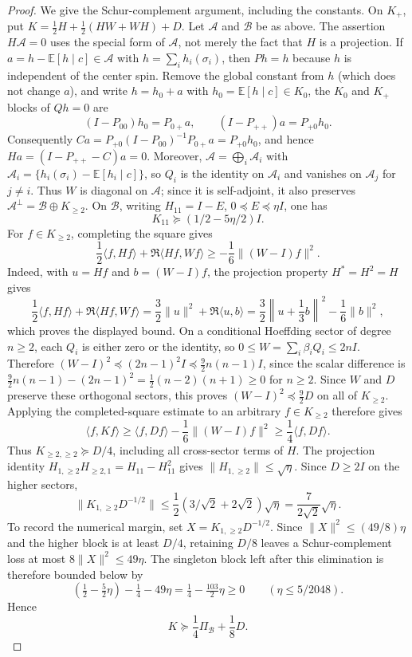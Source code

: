 \begin{proof}
We give the Schur-complement argument, including the constants.  On
$K_+$, put $K=\tfrac12H+\tfrac12(HW+WH)+D$.  Let
$\mathcal A$ and $\mathcal B$ be as above.  The assertion
$H\mathcal A=0$ uses the special form of $\mathcal A$, not merely the
fact that $H$ is a projection.  If
$a=h-\mathbb E[h\mid c]\in\mathcal A$ with
$h=\sum_i h_i(\sigma_i)$, then $Ph=h$ because $h$ is independent of the
center spin.  Remove the global constant from $h$ (which does not change
$a$), and write $h=h_0+a$ with
$h_0=\mathbb E[h\mid c]\in K_0$, the $K_0$ and $K_+$ blocks of $Qh=0$
are
\[
 (I-P_{00})h_0=P_{0+}a,
 \qquad (I-P_{++})a=P_{+0}h_0.
\]
Consequently $Ca=P_{+0}(I-P_{00})^{-1}P_{0+}a=P_{+0}h_0$, and hence
$Ha=(I-P_{++}-C)a=0$.  Moreover,
$\mathcal A=\bigoplus_i\mathcal A_i$ with
$\mathcal A_i=\{h_i(\sigma_i)-\mathbb E[h_i\mid c]\}$, so $Q_i$ is the
identity on $\mathcal A_i$ and vanishes on $\mathcal A_j$ for $j\ne i$.
Thus $W$ is diagonal on $\mathcal A$; since it is self-adjoint, it also
preserves $\mathcal A^\perp=\mathcal B\oplus K_{\ge2}$.
On $\mathcal B$, writing $H_{11}=I-E$, $0\preceq E\preceq\eta I$, one has
\begin{equation}\label{eq:sg-singleton-block}
 K_{11}\succeq(1/2-5\eta/2)I.
\end{equation}
For $f\in K_{\ge2}$, completing the square gives
\[
 \frac{1}{2}\langle f,Hf\rangle+\Re\langle Hf,Wf\rangle
 \ge-\frac{1}{6}\|(W-I)f\|^2.
\]
Indeed, with $u=Hf$ and $b=(W-I)f$, the projection property
$H^*=H^2=H$ gives
\[
 \frac12\langle f,Hf\rangle+\Re\langle Hf,Wf\rangle
 =\frac32\|u\|^2+\Re\langle u,b\rangle
 =\frac32\left\|u+\frac13b\right\|^2-\frac16\|b\|^2,
\]
which proves the displayed bound.  On a conditional Hoeffding sector of
degree $n\ge2$, each $Q_i$ is either zero or the identity, so
$0\le W=\sum_i\beta_iQ_i\le2nI$.  Therefore
$(W-I)^2\preceq(2n-1)^2I\preceq\frac92n(n-1)I$, since the scalar
difference is
$\frac92n(n-1)-(2n-1)^2=\frac12(n-2)(n+1)\ge0$ for $n\ge2$.
Since $W$ and $D$ preserve these orthogonal sectors, this proves
$(W-I)^2\preceq\frac92D$ on all of $K_{\ge2}$.  Applying the
completed-square estimate to an arbitrary $f\in K_{\ge2}$ therefore gives
\[
 \langle f,Kf\rangle
 \ge \langle f,Df\rangle-\frac16\|(W-I)f\|^2
 \ge\frac14\langle f,Df\rangle.
\]
Thus $K_{\ge2,\ge2}\succeq D/4$, including all cross-sector terms of $H$.
The projection identity
$H_{1,\ge2}H_{\ge2,1}=H_{11}-H_{11}^2$ gives
$\|H_{1,\ge2}\|\le\sqrt\eta$.  Since $D\ge2I$ on the higher sectors,
\[
 \|K_{1,\ge2}D^{-1/2}\|
 \le \frac{1}{2}(3/\sqrt2+2\sqrt2)\sqrt\eta
 =\frac{7}{2\sqrt2}\sqrt\eta .
\]
To record the numerical margin, set
$X=K_{1,\ge2}D^{-1/2}$.  Since
$\|X\|^2\le(49/8)\eta$ and the higher block is at least $D/4$, retaining
$D/8$ leaves a Schur-complement loss at most
$8\|X\|^2\le49\eta$.  The singleton block left after this elimination
is therefore bounded below by
\[
 \left(\tfrac12-\tfrac52\eta\right)-\tfrac14-49\eta
 =\tfrac14-\tfrac{103}{2}\eta\ge0
 \qquad(\eta\le5/2048).
\]
Hence
\begin{equation}\label{eq:sg-coercivity}
 K\succeq \frac{1}{4}\Pi_{\mathcal B}+\frac{1}{8}D.
\end{equation}


\end{proof}
